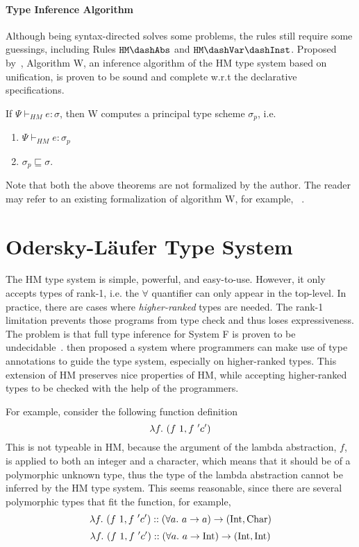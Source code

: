 \paragraph{Type Inference Algorithm}
Although being syntax-directed solves some problems, the rules still require some guessings,
including Rules $\mathtt{HM \dash Abs}$ and $\mathtt{HM \dash Var \dash Inst}$.
Proposed by~\citet{milner1978theory},
Algorithm W,
an inference algorithm of the HM type system based on unification,
is proven to be sound and complete w.r.t the declarative specifications.

\begin{theorem}
    If $\Psi \vdash_{HM} e : \sigma$, then W computes a principal type scheme $\sigma_p$, i.e.
    \begin{enumerate}
        \item $\Psi \vdash_{HM} e : \sigma_p$
        \item $\sigma_p \sqsubseteq \sigma$.
    \end{enumerate}
\end{theorem}

Note that both the above theorems are not formalized by the author.
The reader may refer to an existing formalization of algorithm W,
for example, ~\citep{naraschewski1999type}.


\section{Odersky-L\"aufer Type System}\label{sec:bg:ol}

The HM type system is simple, powerful, and easy-to-use.
However, it only accepts types of rank-1, i.e. the $\forall$
quantifier can only appear in the top-level.
In practice, there are cases where \emph{higher-ranked} types are needed.
The rank-1 limitation prevents those programs from type check
and thus loses expressiveness.
The problem is that full type inference for System F
is proven to be undecidable~\citep{wells1999typability}.
\citet{odersky1996putting} then proposed a system where programmers can
make use of type annotations to guide the type system,
especially on higher-ranked types.
This extension of HM preserves nice properties of HM,
while accepting higher-ranked types to be checked with the help of the programmers.

For example, consider the following function definition
$$\lam[f] (f~1, f~'c')$$
This is not typeable in HM, because the argument of the lambda abstraction, $f$,
is applied to both an integer and a character,
which means that it should be of a polymorphic unknown type,
thus the type of the lambda abstraction cannot be inferred by the HM type system.
This seems reasonable, since there are several polymorphic types that fit the function,
for example,
$$\lam[f] (f~1, f~'c') :: (\all a \to a) \to (\text{Int}, \text{Char})$$
$$\lam[f] (f~1, f~'c') :: (\all a \to \text{Int}) \to (\text{Int}, \text{Int})$$

